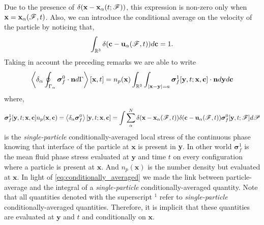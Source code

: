 Due to the presence of $\delta(\textbf{x}-\textbf{x}_\alpha(t; \mathscr{F}))$, this expression is non-zero only when $\textbf{x} = \textbf{x}_\alpha(\mathscr{F},t)$. 
Also, we can introduce the conditional average on the velocity of the particle by noticing that, 
\begin{equation*}
    \int_{\mathbb{R}^3} \delta(\textbf{c} - \textbf{u}_\alpha(\mathscr{F},t)) d\textbf{c} = 1. 
\end{equation*}
Taking in account the preceding remarks we are able to write
\begin{equation}
    \left<\delta_\alpha \oint_{\Gamma_\alpha} \bm\sigma_f^0\cdot\textbf{n} d\Gamma\right>[\textbf{x},t]
    =
    n_p(\textbf{x})
    \int_{\mathbb{R}^3}
    \int_{|\textbf{x}-\textbf{y}|=a}
    \bm\sigma_f^1[\textbf{y},t;\textbf{x},\textbf{c}] \cdot \textbf{n}
    d\textbf{y}
    d\textbf{c}
    \label{eq:conditionally_averaged}
\end{equation}
where, 
\begin{equation*}
    \bm\sigma^1_f[\textbf{y},t;\textbf{x},\textbf{c}] n_p(\textbf{x},\textbf{c})
    =
    \left<\delta_\alpha \bm\sigma^0_f\right>[\textbf{y},t;\textbf{x},\textbf{c}]
    = 
    \int 
    \sum_\alpha^N 
    \delta(\textbf{x} - \textbf{x}_\alpha(\mathscr{F},t))
    \delta(\textbf{c} - \textbf{u}_\alpha(\mathscr{F},t))
    \bm\sigma_f^0[\textbf{y},t;\mathscr{F}]
    d\mathscr{P}
\end{equation*}
is the \textit{single-particle} conditionally-averaged local stress of the continuous phase knowing that interface of the particle at $\textbf{x}$ is  present in \textbf{y}. 
In other world $\bm\sigma^1_f$ is the mean fluid phase stress evaluated at $\textbf{y}$ and time $t$ on every configuration where a particle is present at $\textbf{x}$. 
And $n_p(\textbf{x})$ is the number density but evaluated at $\textbf{x}$.
In light of \ref{eq:conditionally_averaged} we made the link between particle-average and the integral of a \textit{single-particle} conditionally-averaged quantity. 
Note that all quantities denoted with the superscript $^1$ refer to \textit{single-particle} conditionally-averaged  quantities.  
Therefore, it is implicit that these quantities are evaluated at $\textbf{y}$ and $t$ and conditionally on $\textbf{x}$. 


